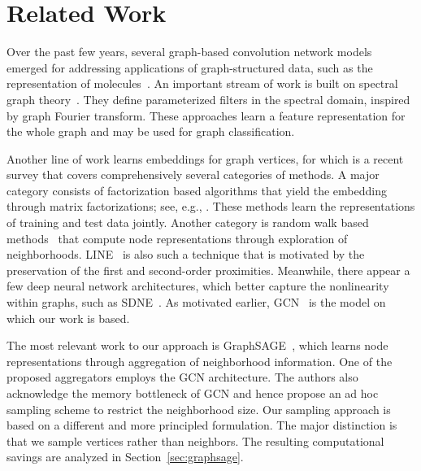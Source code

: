 \documentclass{article} \usepackage{iclr2018_conference,times}
\theoremstyle{plain}\newtheorem{theorem}{Theorem}\theoremstyle{plain}\newtheorem{proposition}[theorem]{Proposition}
\theoremstyle{plain}\newtheorem{corollary}[theorem]{Corollary}
\theoremstyle{plain}\newtheorem{lemma}[theorem]{Lemma}
\begin{document}
\section{Related Work}

Over the past few years, several graph-based convolution network models emerged for addressing applications of graph-structured data, such as the representation of molecules~\citep{NIPS2015_5954}. An important stream of work is built on spectral graph theory~\citep{DBLP:journals/corr/BrunaZSL13, DBLP:journals/corr/HenaffBL15, DBLP:journals/corr/DefferrardBV16}. They define parameterized filters in the spectral domain, inspired by graph Fourier transform. These approaches learn a feature representation for the whole graph and may be used for graph classification.

Another line of work learns embeddings for graph vertices, for which \cite{DBLP:journals/corr/GoyalF17} is a recent survey that covers comprehensively several categories of methods. A major category consists of factorization based algorithms that yield the embedding through matrix factorizations; see, e.g., \cite{Roweis2323,Belkin:2001:LES:2980539.2980616,Ahmed:2013:DLN:2488388.2488393,Cao:2015:GLG:2806416.2806512,Ou:2016:ATP:2939672.2939751}. These methods learn the representations of training and test data jointly. Another category is random walk based methods~\citep{Perozzi:2014:DOL:2623330.2623732,Grover:2016:NSF:2939672.2939754} that compute node representations through exploration of neighborhoods. LINE~\citep{Tang:2015:LLI:2736277.2741093} is also such a technique that is motivated by the preservation of the first and second-order proximities. Meanwhile, there appear a few deep neural network architectures, which better capture the nonlinearity within graphs, such as SDNE~\citep{Wang:2016:SDN:2939672.2939753}. As motivated earlier, GCN~\citep{DBLP:journals/corr/KipfW16} is the model on which our work is based.

The most relevant work to our approach is GraphSAGE~\citep{DBLP:journals/corr/HamiltonYL17}, which learns node representations through aggregation of neighborhood information. One of the proposed aggregators employs the GCN architecture. The authors also acknowledge the memory bottleneck of GCN and hence propose an ad hoc sampling scheme to restrict the neighborhood size. Our sampling approach is based on a different and more principled formulation. The major distinction is that we sample vertices rather than neighbors. The resulting computational savings are analyzed in Section~\ref{sec:graphsage}.
\end{document}
